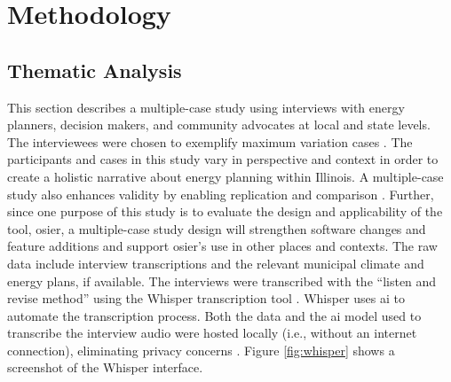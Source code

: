 
\section{Methodology}
\label{section:interview-methods}

\subsection{Thematic Analysis}
This section describes a multiple-case study using interviews with energy
planners, decision makers, and community advocates at local and state levels.
The interviewees were chosen to exemplify maximum variation cases
\cite{flyvbjerg_five_2006}. The participants and cases in this study vary in
perspective and context in order to create a holistic narrative about energy
planning within Illinois. A multiple-case study also enhances validity by
enabling replication and comparison \cite{johannsen_designing_2021,
yin_case_2018}. Further, since one purpose of this study is to evaluate the
design and applicability of the tool, \ac{osier}, a multiple-case study design
will strengthen software changes and feature additions and support \ac{osier}'s
use in other places and contexts. The raw data include interview transcriptions
and the relevant municipal climate and energy plans, if available. The
interviews were transcribed with the ``listen and revise method'' using the
Whisper transcription tool \cite{battaglia_listen_2024}. Whisper uses \ac{ai} to
automate the transcription process. Both the data and the \ac{ai} model used to
transcribe the interview audio were hosted locally (i.e., without an internet
connection), eliminating privacy concerns \cite{battaglia_listen_2024}. Figure
\ref{fig:whisper} shows a screenshot of the Whisper interface. 

